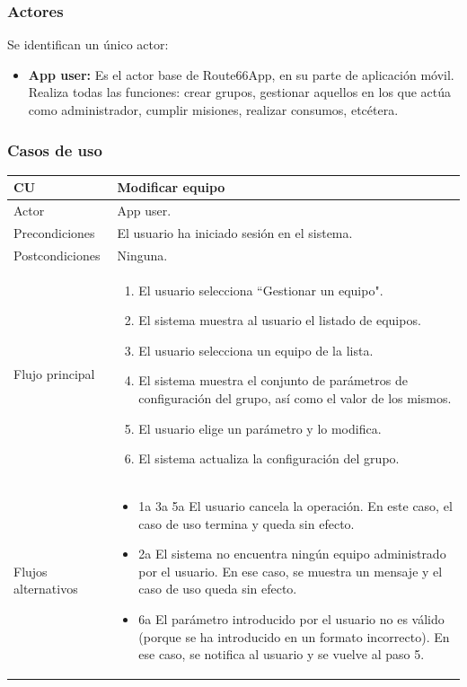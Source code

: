 \documentclass[twoside]{report}
\newcommand\addrow[2]{#1 &#2\\ }
\newcommand\addheading[2]{#1 &#2\\ \hline}
\newcommand\tabularhead{\begin{tabular}{lp{0.7\textwidth}}
\hline
}
\newenvironment{usecase}{\tabularhead}
{\hline\end{tabular}}
\begin{document}
\subsubsection{Actores}

Se identifican un único actor:

\begin{itemize}
\item \textbf{App user:} Es el actor base de Route66App, en su parte de aplicación móvil. Realiza todas las funciones: crear grupos, gestionar aquellos en los que actúa como administrador, cumplir misiones, realizar consumos, etcétera.
\end{itemize}

\subsubsection{Casos de uso}



\begin{usecase}
  \addheading{\textbf{CU\arabic{usecase}}}{Modificar equipo} 
  \addrow{Actor}{App user.}
  \addrow{Precondiciones}{El usuario ha iniciado sesión en el sistema.}
  \addrow{Postcondiciones}{Ninguna.}
  \addrow{Flujo principal}{
  		\begin{enumerate}
  		\item El usuario selecciona “Gestionar un equipo". %
        \item El sistema muestra al usuario el listado de equipos. %
        \item El usuario selecciona un equipo de la lista. %
        \item El sistema muestra el conjunto de parámetros de configuración del grupo, así como el valor de los mismos. %
        \item El usuario elige un parámetro y lo modifica. %
        \item El sistema actualiza la configuración del grupo. %
  		\end{enumerate}
  }
  \addrow{Flujos alternativos}{
  		\begin{itemize}
  		\item 1a 3a 5a El usuario cancela la operación. En este caso, el caso de uso termina y queda sin efecto.
  		\item 2a El sistema no encuentra ningún equipo administrado por el usuario. En ese caso, se muestra un mensaje y el caso de uso queda sin efecto.
  		\item 6a El parámetro introducido por el usuario no es válido (porque se ha introducido en un formato incorrecto). En ese caso, se notifica al usuario y se vuelve al paso 5.
  		\end{itemize}
  }
\end{usecase}\\
\end{document}
